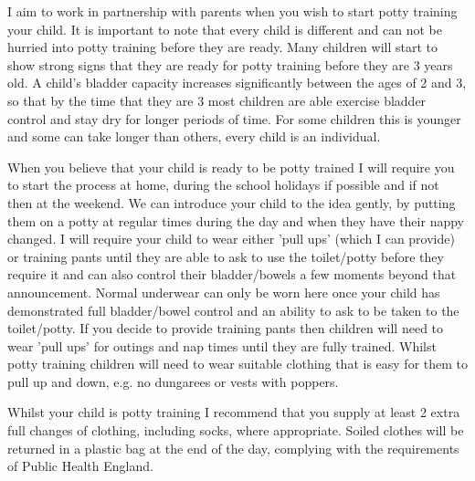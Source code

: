 

I aim to work in partnership with parents when you wish to start potty training your child. It is important to note that every child is different and can not be hurried into potty training before they are ready. Many children will start to show strong signs that they are ready for potty training before they are 3 years old. A child's bladder capacity increases significantly between the ages of 2 and 3, so that by the time that they are 3 most children are able exercise bladder control and stay dry for longer periods of time. For some children this is younger and some can take longer than others, every child is an individual.

When you believe that your child is ready to be potty trained I will require you to start the process at home, during the school holidays if possible and if not then at the weekend. We can introduce your child to the idea gently, by putting them on a potty at regular times during the day and when they have their nappy changed. I will require your child to wear either 'pull ups' (which I can provide) or training pants until they are able to ask to use the toilet/potty before they require it and can also control their bladder/bowels a few moments beyond that announcement. Normal underwear can only be worn here once your child has demonstrated full bladder/bowel control and an ability to ask to be taken to the toilet/potty. If you decide to provide training pants then children will need to wear 'pull ups' for outings and nap times until they are fully trained. Whilst potty training children will need to wear suitable clothing that is easy for them to pull up and down, e.g. no dungarees or vests with poppers. 

Whilst your child is potty training I recommend that you supply at least 2 extra full changes of clothing, including socks, where appropriate. Soiled clothes will be returned in a plastic bag at the end of the day, complying with the requirements of Public Health England.

